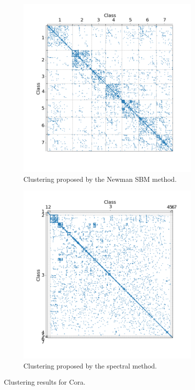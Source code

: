 \documentclass[switch, 12pt]{article}
\begin{document}
\begin{figure}[H]
    \medskip

    \hfill
    \begin{subfigure}{0.45\linewidth}
        \centering
        \includegraphics[width=\linewidth, trim={45 35 35 40}, clip]{figures/cora_Newman.png}
        \caption{Clustering proposed by the Newman SBM method.}
        \label{fig:cora_newman}
    \end{subfigure}
    \hfill
    \begin{subfigure}{0.45\linewidth}
        \centering
        \includegraphics[width=\linewidth, trim={35 25 25 30}, clip]{figures/cora_spetral.png}
        \caption{Clustering proposed by the spectral method.}
        \label{fig:cora_spectral}
    \end{subfigure}
    \hfill
    \caption{Clustering results for Cora.}
    \label{fig:cora_results}
\end{figure}
\end{document}

